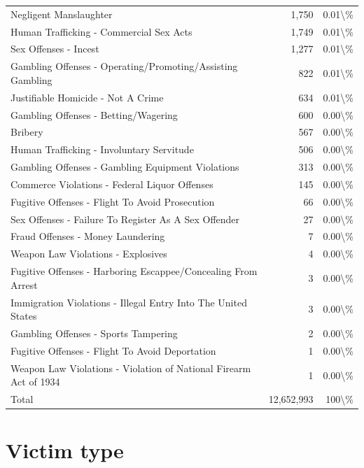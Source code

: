 \documentclass[
  12pt,
  openany]{book}
\begin{document}
\begin{longtable}[t]{lrr}
Negligent Manslaughter & 1,750 & 0.01\textbackslash{}\%\\
Human Trafficking - Commercial Sex Acts & 1,749 & 0.01\textbackslash{}\%\\
Sex Offenses - Incest & 1,277 & 0.01\textbackslash{}\%\\
\addlinespace
Gambling Offenses - Operating/Promoting/Assisting Gambling & 822 & 0.01\textbackslash{}\%\\
Justifiable Homicide - Not A Crime & 634 & 0.01\textbackslash{}\%\\
Gambling Offenses - Betting/Wagering & 600 & 0.00\textbackslash{}\%\\
Bribery & 567 & 0.00\textbackslash{}\%\\
Human Trafficking - Involuntary Servitude & 506 & 0.00\textbackslash{}\%\\
\addlinespace
Gambling Offenses - Gambling Equipment Violations & 313 & 0.00\textbackslash{}\%\\
Commerce Violations - Federal Liquor Offenses & 145 & 0.00\textbackslash{}\%\\
Fugitive Offenses - Flight To Avoid Prosecution & 66 & 0.00\textbackslash{}\%\\
Sex Offenses - Failure To Register As A Sex Offender & 27 & 0.00\textbackslash{}\%\\
Fraud Offenses - Money Laundering & 7 & 0.00\textbackslash{}\%\\
\addlinespace
Weapon Law Violations - Explosives & 4 & 0.00\textbackslash{}\%\\
Fugitive Offenses - Harboring Escappee/Concealing From Arrest & 3 & 0.00\textbackslash{}\%\\
Immigration Violations - Illegal Entry Into The United States & 3 & 0.00\textbackslash{}\%\\
Gambling Offenses - Sports Tampering & 2 & 0.00\textbackslash{}\%\\
Fugitive Offenses - Flight To Avoid Deportation & 1 & 0.00\textbackslash{}\%\\
\addlinespace
Weapon Law Violations - Violation of National Firearm Act of 1934 & 1 & 0.00\textbackslash{}\%\\
Total & 12,652,993 & 100\textbackslash{}\%\\
\bottomrule
\end{longtable}

\section{Victim type}\label{victim-type}
\end{document}
